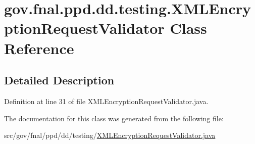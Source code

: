 \hypertarget{classgov_1_1fnal_1_1ppd_1_1dd_1_1testing_1_1XMLEncryptionRequestValidator}{\section{gov.\-fnal.\-ppd.\-dd.\-testing.\-X\-M\-L\-Encryption\-Request\-Validator Class Reference}
\label{classgov_1_1fnal_1_1ppd_1_1dd_1_1testing_1_1XMLEncryptionRequestValidator}
}


\subsection{Detailed Description}


Definition at line 31 of file X\-M\-L\-Encryption\-Request\-Validator.\-java.



The documentation for this class was generated from the following file\-:\begin{DoxyCompactItemize}
\item 
src/gov/fnal/ppd/dd/testing/\hyperlink{XMLEncryptionRequestValidator_8java}{X\-M\-L\-Encryption\-Request\-Validator.\-java}\end{DoxyCompactItemize}
